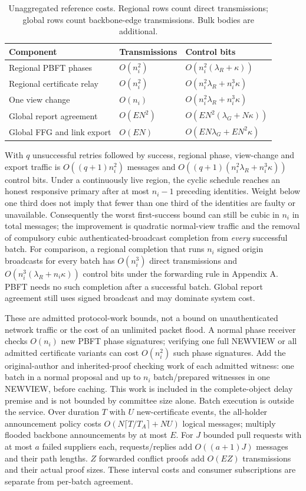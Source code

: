 \documentclass[11pt,a4paper,onecolumn]{article}
\theoremstyle{remark}\newtheorem{example}[definition]{Example}
\newcounter{protocol}
\begin{document}
\begin{table}[htbp]\centering\small
\begin{tabularx}{\textwidth}{@{}p{}p{}Y@{}}\toprule
Component & Transmissions & Control bits\\\midrule
Regional PBFT phases & $O(n_i^2)$ & $O(n_i^2(\lambda_R+\kappa))$\\
Regional certificate relay & $O(n_i^2)$ & $O(n_i^2\lambda_R+n_i^3\kappa)$\\
One view change & $O(n_i)$ & $O(n_i^2\lambda_R+n_i^3\kappa)$\\
Global report agreement & $O(EN^2)$ & $O(EN^2(\lambda_G+N\kappa))$\\
Global FFG and link export & $O(EN)$ & $O(EN\lambda_G+EN^2\kappa)$\\\bottomrule
\end{tabularx}
\caption{Unaggregated reference costs. Regional rows count direct transmissions;
global rows count backbone-edge transmissions. Bulk bodies are additional.}
\end{table}

With $q$ unsuccessful retries followed by success, regional phase, view-change
and export traffic is $O((q+1)n_i^2)$ messages and
$O((q+1)(n_i^2\lambda_R+n_i^3\kappa))$ control bits. Under a continuously live region,
the cyclic schedule reaches an honest responsive primary after at most
$n_i-1$ preceding identities. Weight below one third does not imply that fewer
than one third of the identities are faulty or unavailable. Consequently the
worst first-success bound can still be cubic in $n_i$ in total messages; the
improvement is quadratic normal-view traffic and the removal of compulsory
cubic authenticated-broadcast completion from \emph{every} successful batch.
For comparison, a regional completion that runs $n_i$ signed origin
broadcasts for every batch has $O(n_i^3)$ direct transmissions and
$O(n_i^3(\lambda_R+n_i\kappa))$ control bits under the forwarding rule in Appendix A.
PBFT needs no such completion after a successful batch. Global report agreement
still uses signed broadcast and may dominate system cost.

These are admitted protocol-work bounds, not a bound on unauthenticated
network traffic or the cost of an unlimited packet flood. A normal phase
receiver checks $O(n_i)$ new PBFT phase signatures; verifying one full
NEWVIEW or all admitted certificate variants can cost $O(n_i^2)$ such phase
signatures. Add the original-author and inherited-proof checking work of each
admitted witness: one batch in a normal proposal and up to $n_i$ batch/prepared
witnesses in one NEWVIEW, before caching. This work is included in the
complete-object delay premise and is not bounded by committee size alone.
Batch execution is outside the service.
Over duration $T$ with $U$ new-certificate events, the all-holder announcement
policy costs $O(N\lceil T/T_A\rceil+NU)$ logical messages; multiply flooded
backbone announcements by at most $E$. For $J$ bounded pull requests with at
most $a$ failed suppliers each, requests/replies add $O((a+1)J)$ messages and
their path lengths. $Z$ forwarded conflict proofs add $O(EZ)$ transmissions
and their actual proof sizes. These interval costs and consumer subscriptions
are separate from per-batch agreement.
\end{document}
